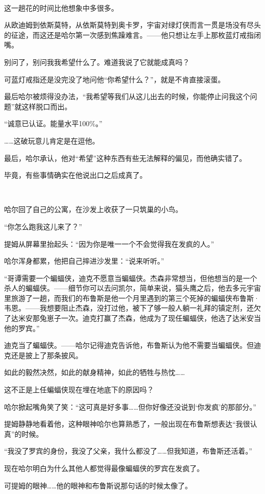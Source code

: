 \documentclass[../main]{subfiles}
\begin{document}
~\

这一趟花的时间比他想象中多很多。

从欧迪姆到依斯莫特，从依斯莫特到奥卡罗，宇宙对绿灯侠而言一贯是场没有尽头的征途，而这还是哈尔第一次感到焦躁难言。——他只想让左手上那枚蓝灯戒指闭嘴。

别问了，别问我我希望什么了。难道我说了它就能成真吗？

可蓝灯戒指还是没完没了地问他“你希望什么？”，就是不肯直接滚蛋。

最后哈尔被烦得没办法，“我希望等我们从这儿出去的时候，你能停止问我这个问题”就这样脱口而出。

“诚意已认证。能量水平100\%。”

……这破玩意儿肯定是在逗他。

最后，哈尔承认，他对“希望”这种东西有些无法解释的偏见，而他确实错了。

毕竟，有些事情确实在他说出口之后成真了。

~\

哈尔回了自己的公寓，在沙发上收获了一只筑巢的小鸟。

“你怎么跑我这儿来了？”

提姆从屏幕里抬起头：“因为你是唯一一个不会觉得我在发疯的人。”

哈尔浑身都累，他把自己摔进沙发里：“说来听听。”

“哥谭需要一个蝙蝠侠，迪克不愿意当蝙蝠侠。杰森非常想当，但他想当的是一个杀人的蝙蝠侠。——细节你可以去问凯尔，简单来说，猫头鹰之后，他去多元宇宙里旅游了一趟，而我们的布鲁斯是他一个月里遇到的第三个死掉的蝙蝠侠布鲁斯·韦恩。——我想要阻止杰森，没打过他，被下了够一般人躺一礼拜的镇定剂，还欠了达米安那兔崽子一次。迪克打赢了杰森，他成为了现任蝙蝠侠，他选了达米安当他的罗宾。”

迪克当了蝙蝠侠。——哈尔记得迪克告诉他，布鲁斯认为他不需要当蝙蝠侠。但迪克还是披上了那条披风。

如此的毅然决然，如此的献身精神，如此的牺牲与热忱……

这不正是上任蝙蝠侠现在埋在地底下的原因吗？

哈尔掀起嘴角笑了笑：“这可真是好多事……但你好像还没说到‘你发疯’的那部分。”

提姆静静地看着他，这种眼神哈尔也算熟悉了，一般出现在布鲁斯想表达“我很认真”的时候。

“我没了罗宾的身份，我没了父亲，我什么都没了……但我知道，布鲁斯还活着。”

现在哈尔明白为什么其他人都觉得最像蝙蝠侠的罗宾在发疯了。

可提姆的眼神……他的眼神和布鲁斯说那句话的时候太像了。
\end{document}
